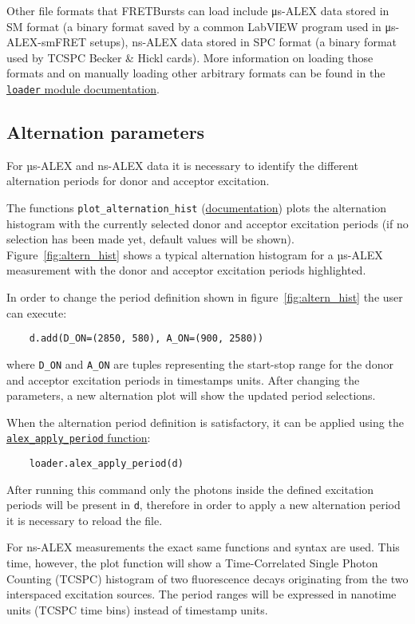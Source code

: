 Other file formats that FRETBursts can load include μs-ALEX data stored in SM format
(a binary format saved by a common LabVIEW program used in μs-ALEX-smFRET setups), 
ns-ALEX data stored in SPC format (a binary format used by TCSPC Becker \& Hickl cards).
More information on loading those formats and on manually loading other arbitrary formats
can be found in the 
\href{http://fretbursts.readthedocs.org/en/latest/loader.html}{\texttt{loader} module documentation}.


\subsection{Alternation parameters}
\label{sec:alternation}

For µs-ALEX and ns-ALEX data it is necessary to identify the different 
alternation periods for donor and acceptor excitation.

The functions 
\verb|plot_alternation_hist| (\href{http://fretbursts.readthedocs.org/en/latest/plots.html#fretbursts.burst\_plot.plot\_alternation\_hist}{documentation})
plots the alternation histogram 
with the currently selected donor and acceptor excitation periods
(if no selection has been made yet, default values will be shown).
Figure~\ref{fig:altern_hist} shows a typical alternation histogram for
a µs-ALEX measurement with the donor and acceptor excitation periods highlighted.

In order to change the period definition shown in figure~\ref{fig:altern_hist}
the user can execute:

\begin{verbatim}
    d.add(D_ON=(2850, 580), A_ON=(900, 2580))
\end{verbatim}

where \verb|D_ON| and \verb|A_ON| are tuples representing 
the start-stop range for the donor and acceptor excitation periods 
in timestamps units. After changing the parameters, a new alternation plot will show the updated period selections.

When the alternation period definition is satisfactory, it can
be applied using the 
\href{http://fretbursts.readthedocs.org/en/latest/loader.html#fretbursts.loader.alex_apply_period}{\texttt{alex\_apply\_period} function}:

\begin{verbatim}
    loader.alex_apply_period(d)
\end{verbatim}

After running this command only the photons inside the defined excitation periods
will be present in \verb|d|, therefore in order to apply a new alternation period 
it is necessary to reload the file.

For ns-ALEX measurements the exact same functions and syntax are used.
This time, however, the plot function will show a Time-Correlated Single Photon Counting (TCSPC) histogram of two fluorescence decays originating from the two interspaced excitation sources. The period ranges will be expressed in nanotime units (TCSPC time bins) instead of 
timestamp units.
